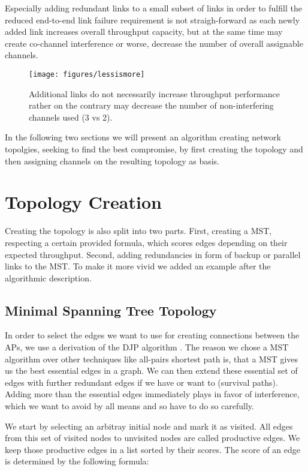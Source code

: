   Especially adding redundant links to a small subset of links in order to fulfill the reduced end-to-end link failure requirement is not straigh-forward as each newly
  added link increases overall throughput capacity, but at the same time may create co-channel interference or worse, decrease the number of overall assignable channels.
  
  \begin{figure}[h!]
    \centering
      \texttt{[image: figures/lessismore]}
      \caption{Additional links do not necessarily increase throughput performance rather on the contrary may decrease the number of non-interfering channels used (3 vs 2).}
    \label{fig:lessismore}
  \end{figure}
  
  In the following two sections we will present an algorithm creating network topolgies, seeking to find the best compromise, by first creating the topology and then
  assigning channels on the resulting topology as basis.
  
 \newpage 
 
  \section{Topology Creation}
    Creating the topology is also split into two parts.
    First, creating a \ac{MST}, respecting a certain provided formula, which scores edges depending on their expected throughput.
    Second, adding redundancies in form of backup or parallel links to the \ac{MST}. 
    To make it more vivid we added an example after the algorithmic description.

    \subsection{Minimal Spanning Tree Topology}
      In order to select the edges we want to use for creating connections between the APs, we use a derivation of the \ac{DJP} algorithm \cite{prim}\cite{jarnik}.
      The reason we chose a \ac{MST} algorithm over other techniques like all-pairs shortest path is, that a MST gives us the best essential edges in a graph. 
      We can then extend these essential set of edges with further redundant edges if we have or want to (survival paths). 
      Adding more than the essential edges immediately plays in favor of interference, which we want to avoid by all means and so have to do so carefully.
      
      We start by selecting an arbitray initial node and mark it as visited. All edges from this set of visited nodes to unvisited nodes are called productive edges.
      We keep those productive edges in a list sorted by their scores. The score of an edge is determined by the following formula:
      
